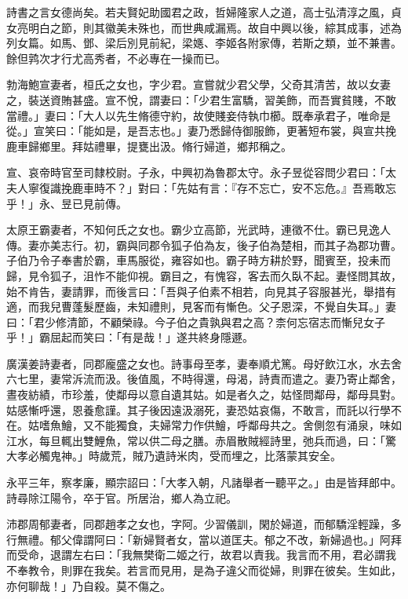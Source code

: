 
\begin{pinyinscope}
詩書之言女德尚矣。若夫賢妃助國君之政，哲婦隆家人之道，高士弘清淳之風，貞女亮明白之節，則其徽美未殊也，而世典咸漏焉。故自中興以後，綜其成事，述為列女篇。如馬、鄧、梁后別見前紀，梁嫕、李姬各附家傳，若斯之類，並不兼書。餘但鹑次才行尤高秀者，不必專在一操而已。

勃海鮑宣妻者，桓氏之女也，字少君。宣嘗就少君父學，父奇其清苦，故以女妻之，裝送資賄甚盛。宣不悅，謂妻曰：「少君生富驕，習美飾，而吾實貧賤，不敢當禮。」妻曰：「大人以先生脩德守約，故使賤妾侍執巾櫛。既奉承君子，唯命是從。」宣笑曰：「能如是，是吾志也。」妻乃悉歸侍御服飾，更著短布裳，與宣共挽鹿車歸鄉里。拜姑禮畢，提甕出汲。脩行婦道，鄉邦稱之。

宣、哀帝時官至司隸校尉。子永，中興初為魯郡太守。永子昱從容問少君曰：「太夫人寧復識挽鹿車時不？」對曰：「先姑有言：『存不忘亡，安不忘危。』吾焉敢忘乎！」永、昱已見前傳。

太原王霸妻者，不知何氏之女也。霸少立高節，光武時，連徵不仕。霸已見逸人傳。妻亦美志行。初，霸與同郡令狐子伯為友，後子伯為楚相，而其子為郡功曹。子伯乃令子奉書於霸，車馬服從，雍容如也。霸子時方耕於野，聞賓至，投耒而歸，見令狐子，沮怍不能仰視。霸目之，有愧容，客去而久臥不起。妻怪問其故，始不肯告，妻請罪，而後言曰：「吾與子伯素不相若，向見其子容服甚光，舉措有適，而我兒曹蓬髮歷齒，未知禮則，見客而有慚色。父子恩深，不覺自失耳。」妻曰：「君少修清節，不顧榮祿。今子伯之貴孰與君之高？柰何忘宿志而慚兒女子乎！」霸屈起而笑曰：「有是哉！」遂共終身隱遯。

廣漢姜詩妻者，同郡龐盛之女也。詩事母至孝，妻奉順尤篤。母好飲江水，水去舍六七里，妻常泝流而汲。後值風，不時得還，母渴，詩責而遣之。妻乃寄止鄰舍，晝夜紡績，市珍羞，使鄰母以意自遺其姑。如是者久之，姑怪問鄰母，鄰母具對。姑感慚呼還，恩養愈謹。其子後因遠汲溺死，妻恐姑哀傷，不敢言，而託以行學不在。姑嗜魚鱠，又不能獨食，夫婦常力作供鱠，呼鄰母共之。舍側忽有涌泉，味如江水，每旦輒出雙鯉魚，常以供二母之膳。赤眉散賊經詩里，弛兵而過，曰：「驚大孝必觸鬼神。」時歲荒，賊乃遺詩米肉，受而埋之，比落蒙其安全。

永平三年，察孝廉，顯宗詔曰：「大孝入朝，凡諸舉者一聽平之。」由是皆拜郎中。詩尋除江陽令，卒于官。所居治，鄉人為立祀。

沛郡周郁妻者，同郡趙孝之女也，字阿。少習儀訓，閑於婦道，而郁驕淫輕躁，多行無禮。郁父偉謂阿曰：「新婦賢者女，當以道匡夫。郁之不改，新婦過也。」阿拜而受命，退謂左右曰：「我無樊衛二姬之行，故君以責我。我言而不用，君必謂我不奉教令，則罪在我矣。若言而見用，是為子違父而從婦，則罪在彼矣。生如此，亦何聊哉！」乃自殺。莫不傷之。


\end{pinyinscope}
